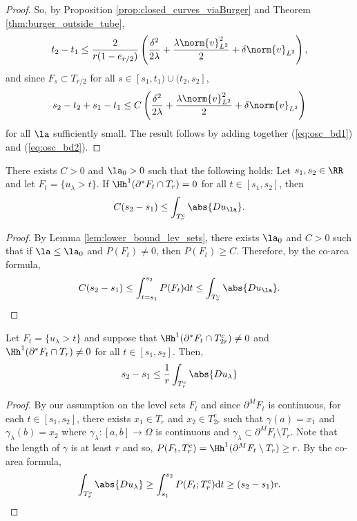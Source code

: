 \begin{proof}
So, by Proposition \ref{prop:closed_curves_viaBurger} and Theorem \ref{thm:burger_outside_tube},  
\begin{equation}\label{eq:osc_bd1}
 t_2 - t_1 \leq \frac{2}{r(1-e_{r/2})}\left(\frac{\delta^2}{2\lambda } +\frac{\lambda  \norm{v}_{L^2}^2}{2 } + \delta \norm{v}_{L^2} \right),
\end{equation}
and since $F_s\subset T_{r/2}$ for all $s \in [s_1,t_1)\cup (t_2,s_2]$,
\begin{equation}\label{eq:osc_bd2}
 s_2-t_2+s_1-t_1 \leq C \left(\frac{\delta^2}{2\lambda} +\frac{\lambda  \norm{v}_{L^2}^2}{2} + \delta \norm{v}_{L^2}\right)
\end{equation}
for all $\la$ sufficiently small.
The result follows by adding together (\ref{eq:osc_bd1}) and (\ref{eq:osc_bd2}).
\end{proof}

\begin{prop}\label{prop:curvature_viaBurger}
 There exists $C>0$ and $\la_0>0$ such that the following holds:
  Let $s_1,s_2\in \RR$ and let $F_t = \{ u_\lambda > t\}$. If $\Hh^1(\partial^* F_t \cap T_r) = 0$ for all $t\in [s_1,s_2]$, then 
$$C(s_2-s_1)  \leq  \int_{T_r^c}\abs{D u_\la}.
$$
\end{prop}
\begin{proof}
By Lemma \ref{lem:lower_bound_lev_sets}, there exists $\la_0$ and $C>0$ such that if $\la\leq \la_0$ and $P(F_t)\neq 0$, then $P(F_t)\geq C$. Therefore, by the co-area formula,
$$C(s_2-s_1) \leq \int_{t=s_1}^{s_2} P(F_t)\mathrm{d}t \leq  \int_{T_r^c}\abs{D u_\la}.
$$

\end{proof}

\begin{prop}\label{prop:closed_curves_viaBurger}
 Let $F_t = \{ u_\lambda > t\}$ and suppose that $\Hh^1(\partial^* F_t \cap T_{2r}^c)\neq 0$ and $\Hh^1(\partial^* F_t \cap T_{r})\neq 0$ for all $t\in [s_1,s_2]$. Then,
 $$
 s_2-s_1 \leq \frac{1}{r }\int_{T_r^c}\abs{D u_\lambda} 
$$
\end{prop}
\begin{proof}
 By our assumption on the level sets $F_t$ and since $\partial^M F_t$ is continuous, for each $t\in [s_1,s_2]$,   there exists $x_1\in T_{r}$ and $x_2\in T_{2r}^c$ such that $\gamma(a)  = x_1$ and $\gamma_{\lambda}(b) = x_2$ where $\gamma_\lambda : [a,b] \to \Omega$ is continuous and $\gamma_\lambda \subset \partial^M F_t\setminus T_{r}$. Note that the length of $\gamma$ is at least $r$ and so, $P(F_t, T_r^c)= \Hh^1(\partial^M F_t \setminus T_r) \geq r$. By the co-area formula,
$$
\int_{T_r^c}\abs{D u_\lambda} \geq \int_{s_1}^{s_2} P(F_t; T_r^c) \mathrm{d}t \geq (s_2-s_1)r.
$$ 

\end{proof}